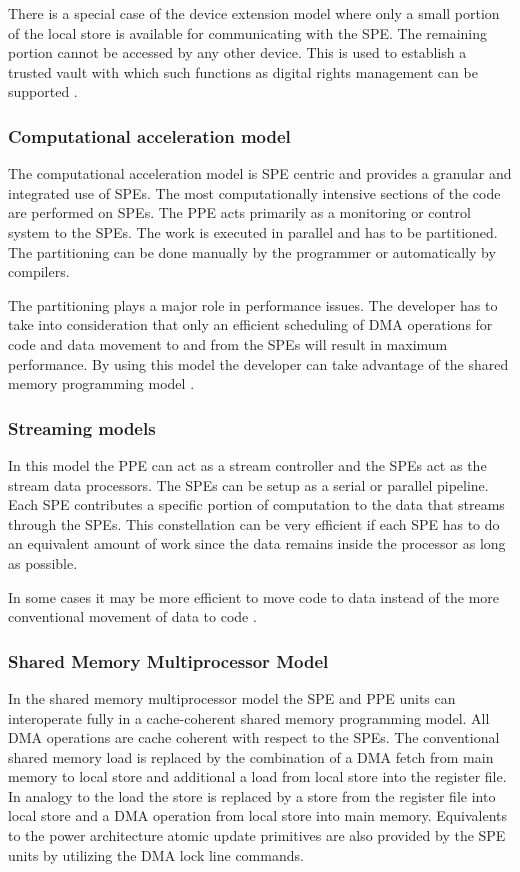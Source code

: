\documentclass[DIV10, abstracton, openright, footsepline, headsepline, twoside, 9pt,
bigheadings]{scrreprt}
\begin{document}
There is a special case of the device extension model where only a small
portion of the local store is available for communicating with the SPE. The
remaining portion cannot be accessed by any other device. This is used to
establish a trusted vault with which such functions as digital rights management
can be supported \cite{Kahle05}.

\subsubsection*{Computational acceleration model}
The computational acceleration model is SPE centric and provides a granular
and integrated use of SPEs. The most computationally intensive sections of the
code are performed on SPEs. The PPE acts primarily as a monitoring or control
system to the SPEs. The work is executed in parallel and has to be
partitioned. The partitioning can be done manually by the programmer or
automatically by compilers.

The partitioning plays a major role in performance issues. The developer has
to take into consideration that only an efficient scheduling of DMA operations
for code and data movement to and from the SPEs will result in maximum
performance. By using this model the developer can take advantage of the shared
memory programming model \cite{Kahle05}.

\subsubsection*{Streaming models}

In this model the PPE can act as a stream controller and the SPEs act as the
stream data processors. The SPEs can be setup as a serial or parallel
pipeline. Each SPE contributes a specific portion of computation to the data
that streams through the SPEs. This constellation can be very efficient if
each SPE has to do an equivalent amount of work since the data remains inside
the processor as long as possible.

In some cases it may be more efficient to move code to data instead of the
more conventional movement of data to code \cite{Kahle05}.

\subsubsection*{Shared Memory Multiprocessor Model}
In the shared memory multiprocessor model the SPE and PPE units can
interoperate fully in a cache-coherent shared memory programming model. All DMA
operations are cache coherent with respect to the SPEs. The conventional
shared memory load is replaced by the combination of a DMA fetch from main
memory to local store and  additional a load from local store into the register
file. In analogy to the load the store is replaced by a store from the register
file into local store and a DMA  operation from local store into main memory.
Equivalents to the power architecture atomic update primitives are also
provided by the SPE units by utilizing the DMA lock line commands.
\end{document}
